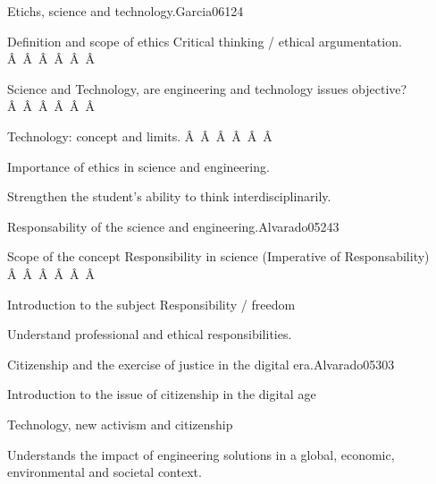 \begin{syllabus}
\begin{unit}{Etichs, science and technology.}{}{Garcia06}{12}{4}
   \begin{topics}
      \item Definition and scope of ethics Critical thinking / ethical argumentation.
Â Â Â Â Â Â \item Science and Technology, are engineering and technology issues objective?
Â Â Â Â Â Â \item Technology: concept and limits.
Â Â Â Â Â Â \item Importance of ethics in science and engineering.
   \end{topics}
   \begin{learningoutcomes}
      \item Strengthen the student's ability to think interdisciplinarily.
   \end{learningoutcomes}
\end{unit}

\begin{unit}{Responsability of the science and engineering.}{}{Alvarado05}{24}{3}
   \begin{topics}
      \item Scope of the concept Responsibility in science (Imperative of Responsability)
Â Â Â Â Â Â \item Introduction to the subject Responsibility / freedom
   \end{topics}

   \begin{learningoutcomes}
      \item Understand professional and ethical responsibilities.
   \end{learningoutcomes}
\end{unit}

\begin{unit}{Citizenship and the exercise of justice in the digital era.}{}{Alvarado05}{30}{3}
   \begin{topics}
      \item Introduction to the issue of citizenship in the digital age
      \item Technology, new activism and citizenship
   \end{topics}

   \begin{learningoutcomes}
      \item  Understands the impact of engineering solutions in a global, economic, environmental and societal context.
   \end{learningoutcomes}
\end{unit}

\begin{coursebibliography}
\end{coursebibliography}

\end{syllabus}
